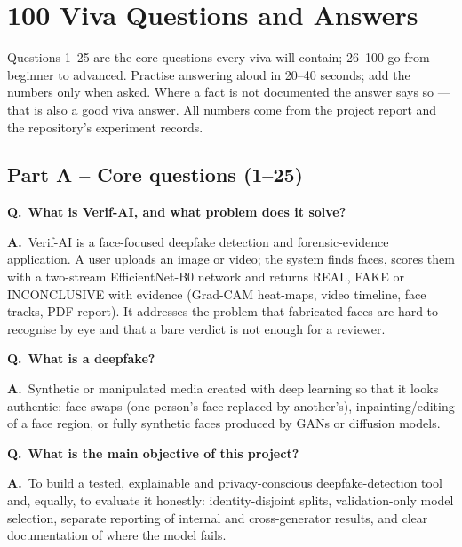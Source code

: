 \documentclass[11pt,a4paper]{report}
\begin{document}
\chapter{100 Viva Questions and Answers}
\begin{keybox}
Questions 1--25 are the core questions every viva will contain; 26--100 go from beginner to advanced. Practise answering aloud in 20--40 seconds; add the numbers only when asked.
Where a fact is not documented the answer says so --- that is also a good viva answer. All numbers come from the project report and the repository's experiment records.
\end{keybox}

\newcommand{\qa}[2]{\stepcounter{qn}\par\Needspace{6\baselineskip}\medskip
\begin{tcolorbox}[colback=navy!6,colframe=navy!40,boxrule=0.4pt,arc=1.5pt,left=5pt,right=5pt,top=2pt,bottom=2pt,unbreakable]
\textbf{Q\theqn.}\ \textbf{#1}\end{tcolorbox}\nopagebreak\vspace{-0.3em}\textbf{A.}\ #2\par}

\section*{Part A -- Core questions (1--25)}

\qa{What is Verif-AI, and what problem does it solve?}{Verif-AI is a face-focused deepfake detection and forensic-evidence application. A user uploads an image or video; the system finds faces, scores them with a two-stream EfficientNet-B0 network and returns REAL, FAKE or INCONCLUSIVE with evidence (Grad-CAM heat-maps, video timeline, face tracks, PDF report). It addresses the problem that fabricated faces are hard to recognise by eye and that a bare verdict is not enough for a reviewer.}

\qa{What is a deepfake?}{Synthetic or manipulated media created with deep learning so that it looks authentic: face swaps (one person's face replaced by another's), inpainting/editing of a face region, or fully synthetic faces produced by GANs or diffusion models.}

\qa{What is the main objective of this project?}{To build a tested, explainable and privacy-conscious deepfake-detection tool and, equally, to evaluate it honestly: identity-disjoint splits, validation-only model selection, separate reporting of internal and cross-generator results, and clear documentation of where the model fails.}
\end{document}
